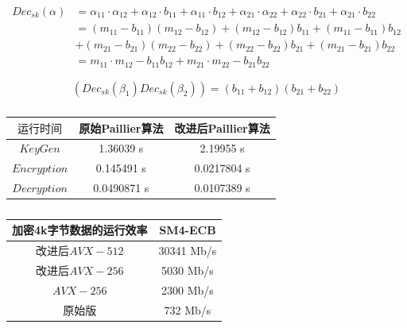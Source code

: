\documentclass[12pt, a4paper, oneside]{ctexart}
\begin{document}
\begin{equation}
    \begin{split}
        Dec_{sk}(\alpha) &= \alpha_{11}\cdot \alpha_{12} + \alpha_{12}\cdot b_{11}+ \alpha_{11}\cdot b_{12}
        + \alpha_{21}\cdot \alpha_{22} + \alpha_{22}\cdot b_{21}+ \alpha_{21}\cdot b_{22}\\
        &=(m_{11}-b_{11})(m_{12}-b_{12})+(m_{12}-b_{12})b_{11}+(m_{11}-b_{11})b_{12}\\
        &+(m_{21}-b_{21})(m_{22}-b_{22})+(m_{22}-b_{22})b_{21}+(m_{21}-b_{21})b_{22}\\
        &= m_{11}\cdot m_{12}-b_{11}b_{12}+m_{21}\cdot m_{22}-b_{21}b_{22}
    \end{split}
\end{equation}

$$(Dec_{sk}(\beta_1)Dec_{sk}(\beta_2)) = (b_{11}+b_{12})(b_{21}+b_{22}) $$

\newpage

\begin{table}[htbp]
    \centering  %
    \caption{ }  %
    \label{tab1}  %
    \begin{tabular}{|c|c|c|}
        \hline
        $ 运行时间$      & 原始Paillier算法 & 改进后Paillier算法 \\
        \hline
        $KeyGen$     & 1.36039 s    & 2.19955 s     \\
        \hline
        $Encryption$ & 0.145491 s   & 0.0217804 s   \\
        \hline
        $Decryption$ & 0.0490871 s  & 0.0107389 s   \\
        \hline
    \end{tabular}
\end{table}


\begin{table}[htbp]
    \centering  %
    \caption{ }  %
    \label{tab111}  %
    \begin{tabular}{|c|c|}
        \hline
        加密4k字节数据的运行效率 & SM4-ECB    \\
        \hline
        改进后$AVX-512$  & 30341 Mb/s \\
        \hline
        改进后$AVX-256$  & 5030 Mb/s  \\
        \hline
        $AVX-256$     & 2300 Mb/s  \\
        \hline
        原始版           & 732 Mb/s   \\
        \hline
    \end{tabular}
\end{table}
\end{document}
